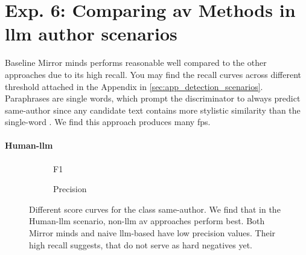 \section{Exp. 6: Comparing \ac{av} Methods in \acs{llm} author scenarios}

Baseline Mirror minds performs reasonable well compared to the other approaches due to its high recall.
You may find the recall curves across different threshold attached in the Appendix in \autoref{sec:app_detection_scenarios}.
Paraphrases are single words, which prompt the discriminator to always predict same-author since any candidate text contains more stylistic similarity than the single-word \imps{}.
We find this approach produces many \acp{fp}.


\paragraph{Human-\ac{llm}}
\begin{figure}[htbp]
  \centering
  \begin{subfigure}[b]{0.48\textwidth}
    \centering
    
    \caption{F1}
    \label{fig:human-lllm_f1}
  \end{subfigure}
  \hfill
  \begin{subfigure}[b]{0.48\textwidth}
    \centering
    
    \caption{Precision}
    \label{fig:student_essays_same_author}
  \end{subfigure}
  \caption{Different score curves for the class same-author. 
  We find that in the Human-\ac{llm} scenario, non-\ac{llm} \ac{av} approaches perform best. 
  Both Mirror minds and naive \ac{llm}-based have low precision values.
  Their high recall suggests, that \imps{} do not serve as hard negatives yet.}
  \label{fig:detec_scen_human-llm}
\end{figure}